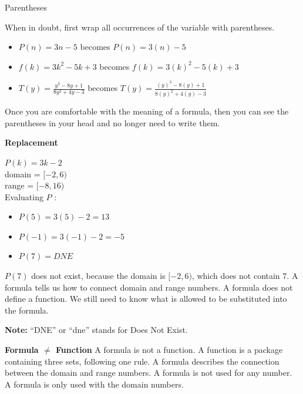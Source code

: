 \documentclass{ximera}
\begin{document}
\begin{example}   Parentheses 

When in doubt, first wrap all occurrences of the variable with parentheses.
\begin{itemize}
\item $P(n) = 3n - 5$ becomes $P(n) = 3(n) - 5$ \\

\item $f(k) = 3k^2 - 5k + 3$ becomes $f(k) = 3(k)^2 - 5(k) + 3$ \\

\item $T(y) = \frac{y^3 - 8y + 1}{8y^2 + 4y - 3}$ becomes $T(y) = \frac{(y)^3 - 8(y) + 1}{8(y)^2 + 4(y) - 3}$
\end{itemize}

\end{example}

Once you are comfortable with the meaning of a formula, then you can see the parentheses in your head and no longer need to write them.










  
\begin{procedure}   \textbf{\textcolor{purple!30!blue}{Replacement}}    

$P(k) = 3k - 2$ \\
domain = $[-2, 6)$ \\
range = $[-8, 16)$ \\

Evaluating $P$ :
\begin{itemize}
\item $P(5) = 3(5) - 2 = 13$
\item $P(-1) = 3(-1) - 2 = -5$
\item $P(7) = DNE$
\end{itemize}


$P(7)$ does not exist, because the domain is $[-2, 6)$, which does not contain $7$.  A formula tells us how to connect domain and range numbers.  A formula does not define a function.  We still need to know what is allowed to be substituted into the formula.

\end{procedure}
\textbf{Note:} ``DNE'' or ``dne'' stands for Does Not Exist. 



\begin{warning}  \textbf{\textcolor{red!70!darkgray}{Formula $\ne$ Function}}   
A formula is not a function.  A function is a package containing three sets, following one rule.  A formula describes the connection between the domain and range numbers. A formula is not used for any number. A formula is only used with the domain numbers.

\end{warning}
\end{document}
